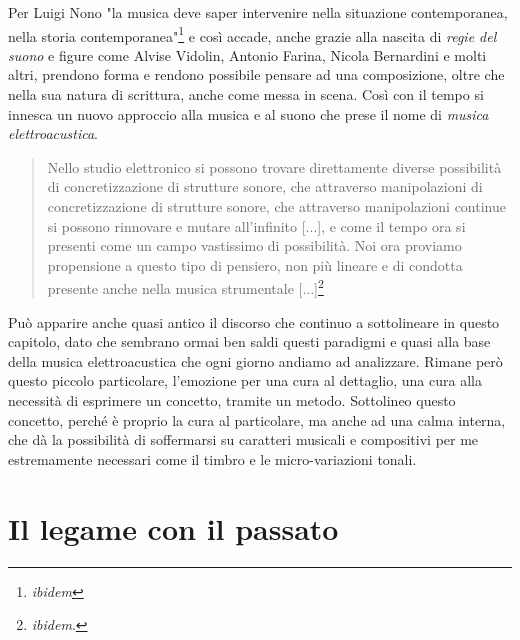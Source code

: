 Per Luigi Nono "la musica deve saper intervenire nella situazione contemporanea, nella storia contemporanea"\footnote{\textit{ibidem}} e così accade, anche grazie alla nascita di \textit{regie del suono} e figure come Alvise Vidolin, Antonio Farina, Nicola Bernardini e molti altri, prendono forma e rendono possibile pensare ad una composizione, oltre che nella sua natura di scrittura, anche come messa in scena. Così con il tempo si innesca un nuovo approccio alla musica e al suono che prese il nome di \textit{musica elettroacustica}.

\begin{quotation}
Nello studio elettronico si possono trovare direttamente diverse possibilità di concretizzazione di strutture sonore, che attraverso manipolazioni di concretizzazione di strutture sonore, che attraverso manipolazioni continue si possono rinnovare e mutare all'infinito [...], e come il tempo ora si presenti come un campo vastissimo di possibilità. Noi ora proviamo propensione a questo tipo di pensiero, non più lineare e di condotta presente anche nella musica strumentale [...]\footnote{\textit{ibidem}.}
\end{quotation}

Può apparire anche quasi antico il discorso che continuo a sottolineare in questo capitolo, dato che sembrano ormai ben saldi questi paradigmi e quasi alla base della musica elettroacustica che ogni giorno andiamo ad analizzare. Rimane però questo piccolo particolare, l'emozione per una cura al dettaglio, una cura alla necessità di esprimere un concetto, tramite un metodo. Sottolineo questo concetto, perché è proprio la cura al particolare, ma anche ad una calma interna, che dà la possibilità di soffermarsi su caratteri musicali e compositivi per me estremamente necessari come il timbro e le micro-variazioni tonali.


\section{Il legame con il passato}


